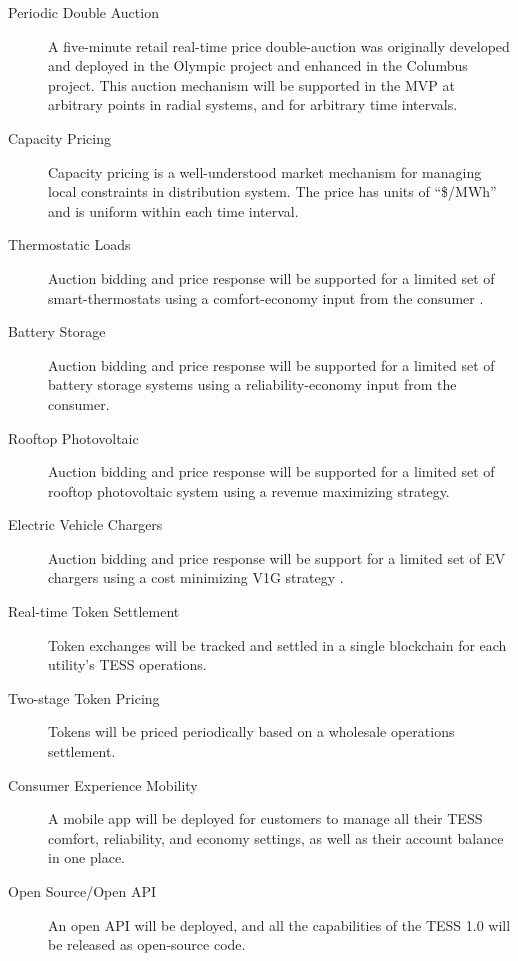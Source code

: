 \begin{description}

    \item[Periodic Double Auction] A five-minute retail real-time price double-auction was originally developed and deployed in the Olympic project and enhanced in the Columbus project. This auction mechanism will be supported in the MVP at arbitrary points in radial systems, and for arbitrary time intervals.
    
    \item[Capacity Pricing] Capacity pricing is a well-understood market mechanism for managing local constraints in distribution system.  The price has units of ``\$/MWh'' and is uniform within each time interval.
    
    \item[Thermostatic Loads] Auction bidding and price response will be supported for a limited set of smart-thermostats using a comfort-economy input from the consumer \cite{hammerstrom2007}.
    
    \item[Battery Storage] Auction bidding and price response will be supported for a limited set of battery storage systems using a reliability-economy input from the consumer.
    
    \item[Rooftop Photovoltaic] Auction bidding and price response will be supported for a limited set of rooftop photovoltaic system using a revenue maximizing strategy.
    
    \item[Electric Vehicle Chargers] Auction bidding and price response will be support for a limited set of EV chargers using a cost minimizing V1G strategy \cite{behboodi2016}.
    
    \item[Real-time Token Settlement] Token exchanges will be tracked and settled in a single blockchain for each utility's TESS operations.
    
    \item[Two-stage Token Pricing] Tokens will be priced periodically based on a wholesale operations settlement.
    
    \item[Consumer Experience Mobility] A mobile app will be deployed for customers to manage all their TESS comfort, reliability, and economy settings, as well as their account balance in one place.

    \item[Open Source/Open API] An open API will be deployed, and all the capabilities of the TESS 1.0 will be released as open-source code.
        
\end{description}

